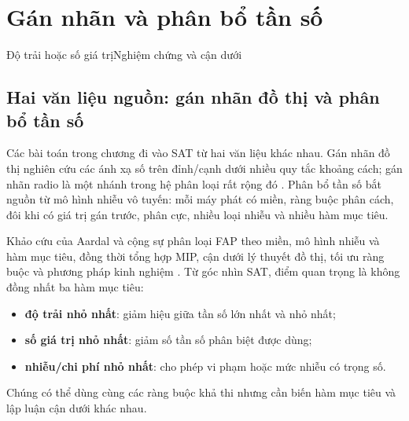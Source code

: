 \chapter{Gán nhãn và phân bổ tần số}


  {Độ trải hoặc số giá trị}{Nghiệm chứng và cận dưới}

\section{Hai văn liệu nguồn: gán nhãn đồ thị và phân bổ tần số}

Các bài toán trong chương đi vào SAT từ hai văn liệu khác nhau. Gán nhãn đồ
thị nghiên cứu các ánh xạ số trên đỉnh/cạnh dưới nhiều quy tắc khoảng cách;
gán nhãn radio là một nhánh trong hệ phân loại rất rộng đó
\parencite{gallian2024labeling}. Phân bổ tần số bắt nguồn từ mô hình nhiễu vô
tuyến: mỗi máy phát có miền, ràng buộc phân cách, đôi khi có giá trị gán trước,
phân cực, nhiều loại nhiễu và nhiều hàm mục tiêu.

Khảo cứu của Aardal và cộng sự phân loại FAP theo miền, mô hình nhiễu và hàm
mục tiêu, đồng thời tổng hợp MIP, cận dưới lý thuyết đồ thị, tối ưu ràng buộc
và phương pháp kinh nghiệm \parencite{aardal2007frequency}. Từ góc nhìn SAT,
điểm quan trọng là không đồng nhất ba hàm mục tiêu:
\begin{itemize}
  \item \textbf{độ trải nhỏ nhất}: giảm hiệu giữa tần số lớn nhất và nhỏ nhất;
  \item \textbf{số giá trị nhỏ nhất}: giảm số tần số phân biệt được dùng;
  \item \textbf{nhiễu/chi phí nhỏ nhất}: cho phép vi phạm hoặc mức nhiễu có
        trọng số.
\end{itemize}
Chúng có thể dùng cùng các ràng buộc khả thi nhưng cần biến hàm mục tiêu và lập
luận cận dưới khác nhau.

